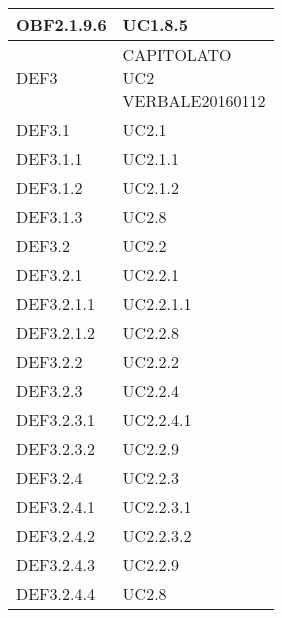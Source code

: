 \documentclass{scalatekids-article}
\begin{document}
\begin{longtable}[H]{|p{5.5cm}|p{5.5cm}|}
  \hline
  OBF2.1.9.6 & \multiLineCell[t]{UC1.8.5\\}\\
  \hline
  DEF3 & \multiLineCell[t]{CAPITOLATO\\UC2\\VERBALE20160112\\}\\
  \hline
  DEF3.1 & \multiLineCell[t]{UC2.1\\}\\
  \hline
  DEF3.1.1 & \multiLineCell[t]{UC2.1.1\\}\\
  \hline
  DEF3.1.2 & \multiLineCell[t]{UC2.1.2\\}\\
  \hline
  DEF3.1.3 & \multiLineCell[t]{UC2.8\\}\\
  \hline
  DEF3.2 & \multiLineCell[t]{UC2.2\\}\\
  \hline
  DEF3.2.1 & \multiLineCell[t]{UC2.2.1\\}\\
  \hline
  DEF3.2.1.1 & \multiLineCell[t]{UC2.2.1.1\\}\\
  \hline
  DEF3.2.1.2 & \multiLineCell[t]{UC2.2.8\\}\\
  \hline
  DEF3.2.2 & \multiLineCell[t]{UC2.2.2\\}\\
  \hline
  DEF3.2.3 & \multiLineCell[t]{UC2.2.4\\}\\
  \hline
  DEF3.2.3.1 & \multiLineCell[t]{UC2.2.4.1\\}\\
  \hline
  DEF3.2.3.2 & \multiLineCell[t]{UC2.2.9\\}\\
  \hline
  DEF3.2.4 & \multiLineCell[t]{UC2.2.3\\}\\
  \hline
  DEF3.2.4.1 & \multiLineCell[t]{UC2.2.3.1\\}\\
  \hline
  DEF3.2.4.2 & \multiLineCell[t]{UC2.2.3.2\\}\\
  \hline
  DEF3.2.4.3 & \multiLineCell[t]{UC2.2.9\\}\\
  \hline
  DEF3.2.4.4 & \multiLineCell[t]{UC2.8\\}\\

\end{longtable}
\end{document}
